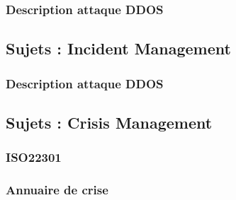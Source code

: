 \subsubsection{Description attaque DDOS}


\subsection{Sujets : Incident Management}
\subsubsection{Description attaque DDOS}


\subsection{Sujets : Crisis Management}
\subsubsection{ISO22301}
\subsubsection{Annuaire de crise}





